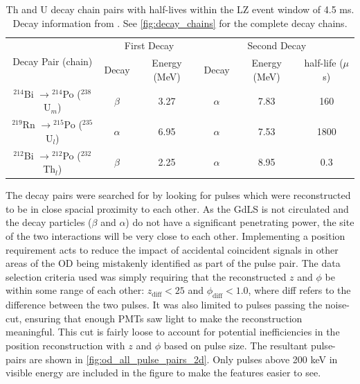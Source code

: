 \begin{table}[]
    \centering
    \begin{tabular}{c|c|c|c|c|c}
        \multirow{2}{*}{Decay Pair (chain)}                    & \multicolumn{2}{c|}{First Decay}   & \multicolumn{3}{c}{Second Decay}    \\ 
                                                               & Decay    & Energy (MeV) & Decay    & Energy (MeV) & half-life ($\mu$s) \\ \hline
        ${}^{214}$Bi $\to {}^{214}$Po (${}^{238}$U$_{m}$)          & $\beta$  & 3.27         & $\alpha$ & 7.83         & 160   \\ 
        ${}^{219}$Rn $\to {}^{215}$Po (${}^{235}$U$_{l}$)          & $\alpha$ & 6.95         & $\alpha$ & 7.53         & 1800  \\ 
        ${}^{212}$Bi $\to {}^{212}$Po (${}^{232}$Th$_{l}$)         & $\beta$  & 2.25         & $\alpha$ & 8.95         & 0.3
    \end{tabular}
    \caption{Th and U decay chain pairs with half-lives within the LZ event window of 4.5 ms. 
             Decay information from \cite{radon_chains_ref}.
             See \autoref{fig:decay_chains} for the complete decay chains.}
    \label{tab:od_constrainable_decays_in_data}
\end{table}

\par
The decay pairs were searched for by looking for pulses which were reconstructed to be in close spacial proximity to each other.
As the GdLS is not circulated and the decay particles ($\beta$ and $\alpha$) do not have a significant penetrating power, the site of the two interactions will be very close to each other.
Implementing a position requirement acts to reduce the impact of accidental coincident signals in other areas of the OD being mistakenly identified as part of the pulse pair.
The data selection criteria used was simply requiring that the reconstructed $z$ and $\phi$ be within some range of each other: $z_{\text{diff}} < 25$ and $\phi_{\text{diff}} < 1.0$, where diff refers to the difference between the two pulses.
It was also limited to pulses passing the noise-cut, ensuring that enough PMTs saw light to make the reconstruction meaningful.
This cut is fairly loose to account for potential inefficiencies in the position reconstruction with $z$ and $\phi$ based on pulse size.
The resultant pulse-pairs are shown in \autoref{fig:od_all_pulse_pairs_2d}.
Only pulses above 200 keV in visible energy are included in the figure to make the features easier to see.

